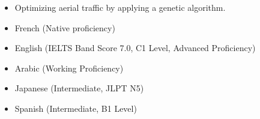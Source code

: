 \documentclass[10pt,a4paper,ragged2e,withhyper]{altacv}
\begin{document}
\begin{paracol}{2}
\divider
\medskip


\begin{itemize}
\item Optimizing aerial traffic by applying a genetic algorithm.  
\end{itemize}


\divider
\medskip



\newpage









\switchcolumn



\begin{itemize}
    \item French (Native proficiency)
    \item English (IELTS Band Score 7.0, C1 Level, Advanced Proficiency)
    \item Arabic (Working Proficiency)
    \item Japanese (Intermediate, JLPT N5)
    \item Spanish (Intermediate, B1 Level) 
\end{itemize}


\end{paracol}
\end{document}
